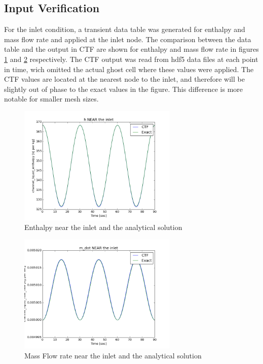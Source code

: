 \documentclass{mc2015}
\begin{document}
\subsection{Input Verification}

For the inlet condition, a transient data table was generated for enthalpy and
mass flow rate and applied at the inlet node. The comparison between the data
table and the output in CTF are shown for enthalpy and mass flow rate in figures
\ref{fig:Inlet_h} and \ref{fig:Inlet_m_dot} respectively. The CTF output was
read from hdf5 data files at each point in time, wich omitted the actual ghost
cell where these values were applied. The CTF values are located at the nearest
node to the inlet, and therefore will be slightly out of phase to the exact
values in the figure. This difference is more notable for smaller mesh sizes.

\begin{figure}[!h]
	\centering
	\includegraphics[width=0.675\textwidth]{images/Inlet_h}
	\caption{Enthalpy near the inlet and the analytical solution}
	\label{fig:Inlet_h}
\end{figure}

\begin{figure}[!h]
	\centering
	\includegraphics[width=0.675\textwidth]{images/Inlet_m_dot}
	\caption{Mass Flow rate near the inlet and the analytical solution}
	\label{fig:Inlet_m_dot}
\end{figure}
\end{document}

